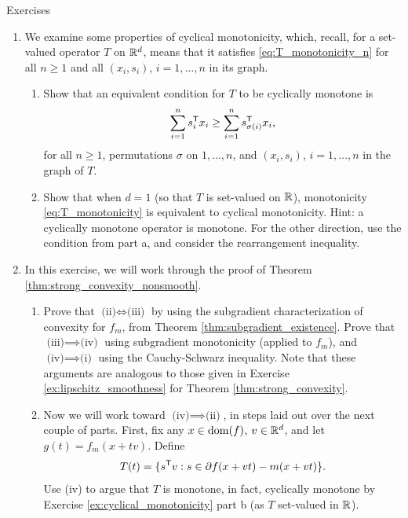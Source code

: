 \begin{xcb}{Exercises}
\begin{enumerate}[label=\thechapter.\arabic*]
\item \label{ex:cyclical_monotonicity}
  We examine some properties of cyclical monotonicity, which, recall, for a 
  set-valued operator $T$ on $\mathbb{R}^d$, means that it satisfies
  \eqref{eq:T_monotonicity_n} for all $n \geq 1$ and all $(x_i, s_i)$,
  $i=1,\dots,n$ in its graph.   

\begin{enumerate}[label=\alph*.]
\item Show that an equivalent condition for $T$ to be cyclically monotone is
  \[
  \sum_{i=1}^n s_i^{\mathsf{T}} x_i \geq \sum_{i=1}^n s_{\sigma(i)}^{\mathsf{T}} x_i,
  \]
  for all $n \geq 1$, permutations $\sigma$ on $1,\dots,n$, and $(x_i, s_i)$,
  $i=1,\dots,n$ in the graph of $T$.  

\item Show that when $d=1$ (so that $T$ is set-valued on $\mathbb{R}$), 
  monotonicity \eqref{eq:T_monotonicity} is equivalent to cyclical
  monotonicity. Hint: a cyclically monotone operator is monotone. For the other
  direction, use the condition from part a, and consider the rearrangement
  inequality.        

\end{enumerate}

\item \label{ex:strong_convexity_nonsmooth}
  In this exercise, we will work through the proof of Theorem
  \ref{thm:strong_convexity_nonsmooth}. 

\begin{enumerate}[label=\alph*.]
\item Prove that $\text{(ii)} \iff \text{(iii)}$ by using the subgradient
  characterization of convexity for $f_m$, from Theorem
  \ref{thm:subgradient_existence}. Prove that $\text{(iii)} \implies
  \text{(iv)}$ using subgradient monotonicity (applied to $f_m$), and
  $\text{(iv)} \implies \text{(i)}$ using the Cauchy-Schwarz inequality. Note
  that these arguments are analogous to those given in Exercise 
  \ref{ex:lipschitz_smoothness} for Theorem \ref{thm:strong_convexity}.   
  
\item Now we will work toward $\text{(iv)} \implies \text{(ii)}$, in steps laid
  out over the next couple of parts. First, fix any $x \in \operatorname{dom}(f)$, $v \in
  \mathbb{R}^d$, and let $g(t) = f_m(x + tv)$. Define 
  \[
  T(t) = \{ s^{\mathsf{T}} v : s \in \partial f(x+vt) - m(x+vt) \}.
  \]
  Use (iv) to argue that $T$ is monotone, in fact, cyclically monotone by
  Exercise \ref{ex:cyclical_monotonicity} part b (as $T$ set-valued in $\mathbb{R}$). 


\end{enumerate}
\end{enumerate}
\end{xcb}
